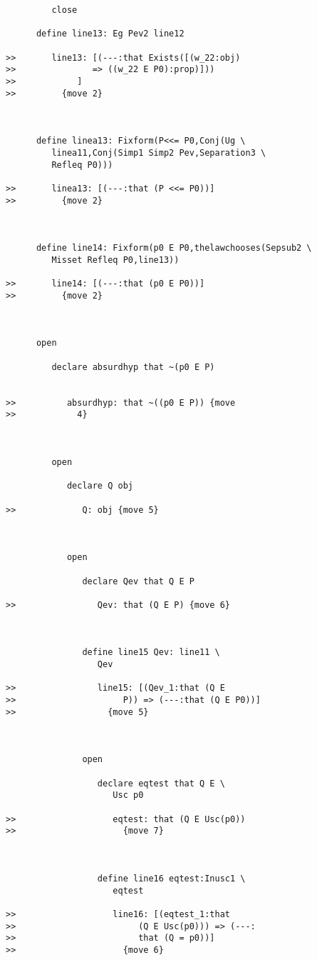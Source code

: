 \documentclass[12pt]{article}
\begin{document}
\begin{verbatim}
         close

      define line13: Eg Pev2 line12

>>       line13: [(---:that Exists([(w_22:obj)
>>               => ((w_22 E P0):prop)]))
>>            ]
>>         {move 2}



      define linea13: Fixform(P<<= P0,Conj(Ug \
         linea11,Conj(Simp1 Simp2 Pev,Separation3 \
         Refleq P0)))

>>       linea13: [(---:that (P <<= P0))]
>>         {move 2}



      define line14: Fixform(p0 E P0,thelawchooses(Sepsub2 \
         Misset Refleq P0,line13))

>>       line14: [(---:that (p0 E P0))]
>>         {move 2}



      open

         declare absurdhyp that ~(p0 E P)


>>          absurdhyp: that ~((p0 E P)) {move
>>            4}



         open

            declare Q obj

>>             Q: obj {move 5}



            open

               declare Qev that Q E P

>>                Qev: that (Q E P) {move 6}



               define line15 Qev: line11 \
                  Qev

>>                line15: [(Qev_1:that (Q E
>>                     P)) => (---:that (Q E P0))]
>>                  {move 5}



               open

                  declare eqtest that Q E \
                     Usc p0

>>                   eqtest: that (Q E Usc(p0))
>>                     {move 7}



                  define line16 eqtest:Inusc1 \
                     eqtest

>>                   line16: [(eqtest_1:that
>>                        (Q E Usc(p0))) => (---:
>>                        that (Q = p0))]
>>                     {move 6}




\end{verbatim}
\end{document}
